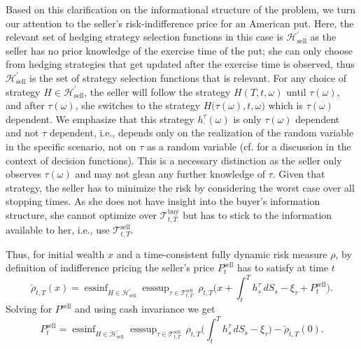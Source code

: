 \documentclass{article}
\DeclareMathOperator*{\essinf}{ess inf}
\DeclareMathOperator*{\esssup}{ess sup}
\begin{document}
Based on this clarification on the informational structure of the problem, we turn our attention to the seller's risk-indifference price for an American put. Here, the relevant set of hedging strategy selection functions in this case is $\mathcal{H}^\prime_{\text{sell}}$ as the seller has no prior knowledge of the exercise time of the put; she can only choose from hedging strategies that get updated after the exercise time is observed, thus $\mathcal{H}^\prime_{\text{sell}}$ is the set of strategy selection functions that is relevant.  For any choice of strategy $H\in \mathcal{H}^\prime_{\text{sell}}$, the seller will follow the strategy  $H(T, t, \omega)$ until $\tau(\omega)$, and after $\tau(\omega)$, she switches to the strategy $H\bigl(\tau(\omega),t,\omega\bigr)$ which is $\tau(\omega)$ dependent. We emphasize that this strategy $h_\cdot^\tau(\omega)$ is only $\tau(\omega)$ dependent and not $\tau$ dependent, i.e., depends only on the realization of the random variable in the specific scenario, not on $\tau$ as a random variable (cf. \cite[Section 2]{Kue02} for a discussion in the context of decision functions). This is a necessary distinction as the seller only observes $\tau(\omega)$ and may not glean any further knowledge of $\tau$. Given that strategy, the seller has to minimize the risk by considering the worst case over all stopping times. As she does not have insight into the buyer's information structure, she cannot optimize over $\mathcal{T}_{t,T}^\text{buy}$ but has to stick to the information available to her, i.e., use $\mathcal{T}_{t,T}^\text{sell}$.

Thus, for initial wealth $x$ and a time-consistent fully dynamic risk measure $\rho$, by definition of indifference pricing the seller's price $P^\text{sell}_t$ has to satisfy at time $t$
\begin{equation*}
	\check{\rho}_{t,T}(x)=\essinf_{H\in \mathcal H^\prime_\text{sell}}\esssup_{\tau\in \mathcal{T}_{t,T}^\text{sell}}\, \rho_{t,T}\biggl(x+\int_t^T h_s^\tau \,  dS_s -
	\xi_\tau+P_t^\text{sell}\biggr).
\end{equation*}
Solving for $P^\text{sell}$ and using cash invariance we get
\begin{equation}\label{S}\tag{S}
	P_t^\text{sell} = \essinf_{H\in \mathcal H^\prime_\text{sell}} \esssup_{\tau\in \mathcal{T}_{t,T}^\text{sell}}\, \rho_{t,T}\biggl(\int_t^T h_s^\tau \, dS_s -
	\xi_\tau\biggr) - \check{\rho}_{t,T}(0).
\end{equation}
\end{document}
